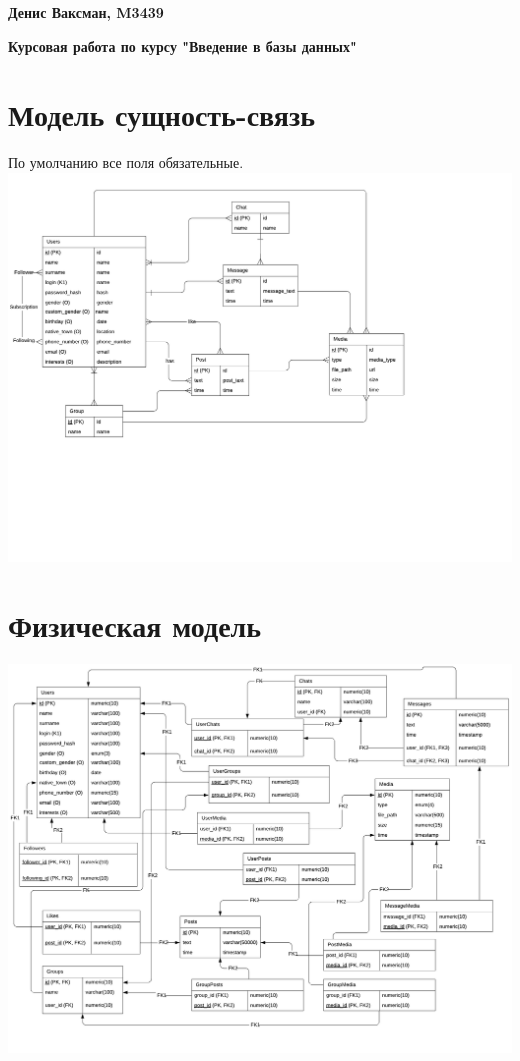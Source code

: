 \documentclass[12pt, a4paper] {ncc}
\begin{document}
\textbf{Денис Ваксман, M3439}


\textbf{Курсовая работа по курсу "Введение в базы данных"}


\section{Модель сущность-связь}
По умолчанию все поля обязательные. \\
\includegraphics[scale=0.8]{rel.png}
\section{Физическая модель}
\includegraphics[scale=0.6]{phys.png}
\end{document}
